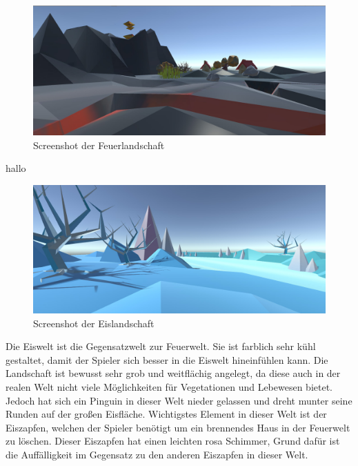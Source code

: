 
\begin{figure}[!htbp]%
	\centering
		\includegraphics[width=1.0\textwidth]{images/Feuer}
	\caption{Screenshot der Feuerlandschaft}
	\label{fig:Feuer}
\end{figure}

hallo


\begin{figure}[!htbp]
	\centering
		\includegraphics[width=1.0\textwidth]{images/Eis}
	\caption{Screenshot der Eislandschaft}
	\label{fig:Eis}
\end{figure}

Die Eiswelt ist die Gegensatzwelt zur Feuerwelt. Sie ist farblich sehr kühl gestaltet, damit der Spieler sich besser in die Eiswelt hineinfühlen kann. Die Landschaft ist bewusst sehr grob und weitflächig angelegt, da diese auch in der realen Welt nicht viele Möglichkeiten für Vegetationen und Lebewesen bietet. Jedoch hat sich ein Pinguin in dieser Welt nieder gelassen und dreht munter seine Runden auf der großen Eisfläche. Wichtigstes Element in dieser Welt ist der Eiszapfen, welchen der Spieler benötigt um ein brennendes Haus in der Feuerwelt zu löschen. Dieser Eiszapfen hat einen leichten rosa Schimmer, Grund dafür ist die Auffälligkeit im Gegensatz zu den anderen Eiszapfen in dieser Welt.

